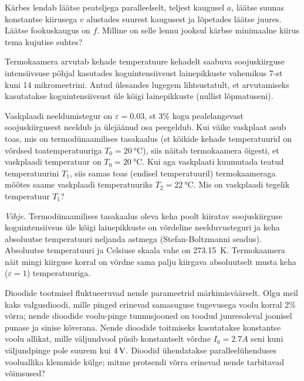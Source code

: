 \documentclass[10pt]{article}
\begin{document}
\setAuthor{}

Kärbes lendab läätse peateljega paralleelselt, teljest kaugusel $a$, läätse suunas konstantse kiirusega $v$ alustades suurest kaugusest ja lõpetades läätse juures. Läätse fookuskaugus on $f$. Milline on selle lennu jooksul kärbse minimaalne kiirus tema kujutise suhtes?
\probend
\bigskip


Termokaamera arvutab kehade temperatuure kehadelt saabuva soojuskiirguse intensiivsuse põhjal kasutades koguintensiivsust lainepikkuste vahemikus 7-st kuni 14 mikromeetrini. Antud ülesandes lugegem lihtsustatult, et arvutamiseks kasutatakse koguintensiivsust üle kõigi lainepikkuste (nullist lõpmatuseni). 
	
	Vaskplaadi neeldumistegur on $\varepsilon = \num{0.03}$, st 3\% kogu pealelangevast soojuskiirgusest neeldub ja ülejäänud osa peegeldub. Kui väike vaskplaat asub toas, mis on termodünaamilises tasakaalus (st kõikide kehade temperatuurid on võrdsed toatemperatuuriga $T_0=\SI {20}\celsius$), siis näitab termokaamera õigesti, et vaskplaadi temperatuur on $T_0=\SI {20}\celsius$. Kui aga  vaskplaati kuumutada teatud temperatuurini $T_1$, siis samas toas (endisel temperatuuril) termokaameraga mõõtes saame vaskplaadi temperatuuriks $T_2=\SI {22}\celsius$. Mis on vaskplaadi tegelik temperatuur $T_1$?
	
	\textit{Vihje.} Termodünaamilises tasakaalus oleva keha poolt kiiratav soojuskiirguse koguintensiivsus üle kõigi lainepikkuste on võrdeline neelduvusteguri ja keha absoluutse temperatuuri neljanda astmega (Stefan-Boltzmanni seadus). Absoluutse temperatuuri ja Celsiuse skaala vahe on \SI{273.15}{K}. Termokaamera näit mingi kiirguse korral on võrdne sama palju kiirgava absoluutselt musta keha ($\varepsilon = 1$) temperatuuriga.
	
	
	
	
\probend
\bigskip

\setAuthor{}

Dioodide tootmisel fluktueeruvad nende parameetrid märkimisväärselt. Olgu meil kaks valgusdioodi, mille pinged erinevad samasuguse tugevusega voolu korral 2\% võrra; nende dioodide voolu-pinge tunnusjooned on toodud juuresoleval joonisel punase ja sinise kõverana. Nende dioodide toitmiseks kasutatakse konstantse voolu allikat, mille väljundvool püsib konstantselt võrdne $I_0=\SI{2.7}A$ seni kuni väljundpinge pole suurem kui $\SI 4V$. Dioodid ühendatakse paralleelühenduses vooluallika klemmide külge; mitme protsendi võrra erinevad nende tarbitavad võimsused?
\probend
\bigskip
\end{document}
